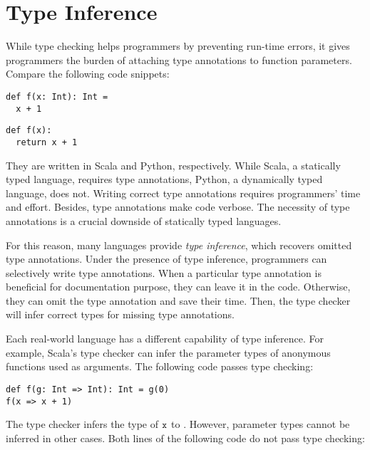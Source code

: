 \setchapterpreamble[u]{\margintoc}
\chapter{Type Inference}

\renewcommand{\plang}{\textsf{TFAE}\xspace}
\renewcommand{\lang}{\textsf{TIFAE}\xspace}

While type checking helps programmers by preventing run-time errors, it gives
programmers the burden of attaching type annotations to function parameters.
Compare the following code snippets:

\begin{verbatim}
def f(x: Int): Int =
  x + 1
\end{verbatim}

\begin{verbatim}
def f(x):
  return x + 1
\end{verbatim}

They are written in Scala and Python, respectively. While Scala, a statically
typed language, requires type annotations, Python, a dynamically typed language,
does not. Writing correct type annotations requires programmers' time and
effort. Besides, type annotations make code verbose. The necessity of type
annotations is a crucial downside of statically typed languages.

For this reason, many languages provide \textit{type inference}, which recovers omitted type annotations. Under the presence of type
inference, programmers can selectively write type annotations. When a particular
type annotation is beneficial for documentation purpose, they can leave it in
the code. Otherwise, they can omit the type annotation and save their time.
Then, the type checker will infer correct types for missing type annotations.

Each real-world language has a different capability of type inference. For
example, Scala's type checker can infer the parameter types of anonymous
functions used as arguments. The following code passes type checking:

\begin{verbatim}
def f(g: Int => Int): Int = g(0)
f(x => x + 1)
\end{verbatim}

The type checker infers the type of $\texttt{x}$ to . However, parameter
types cannot be inferred in other cases. Both lines of the following code do
not pass type checking:

